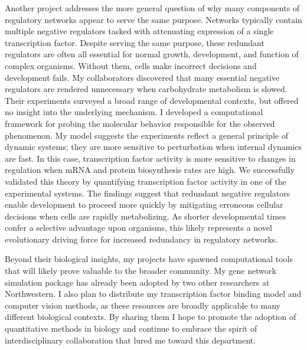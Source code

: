 Another project addresses the more general question of why many components of regulatory networks appear to serve the same purpose. Networks typically contain multiple negative regulators tasked with attenuating expression of a single transcription factor. Despite serving the same purpose, these redundant regulators are often all essential for normal growth, development, and function of complex organisms. Without them, cells make incorrect decisions and development fails. My collaborators discovered that many essential negative regulators are rendered unnecessary when carbohydrate metabolism is slowed. Their experiments surveyed a broad range of developmental contexts, but offered no insight into the underlying mechanism. I developed a computational framework for probing the molecular behavior responsible for the observed phenomenon. My model suggests the experiments reflect a general principle of dynamic systems; they are more sensitive to perturbation when internal dynamics are fast. In this case, transcription factor activity is more sensitive to changes in regulation when mRNA and protein biosynthesis rates are high. We successfully validated this theory by quantifying transcription factor activity in one of the experimental systems. The findings suggest that redundant negative regulators enable development to proceed more quickly by mitigating erroneous cellular decisions when cells are rapidly metabolizing. As shorter developmental times confer a selective advantage upon organisms, this likely represents a novel evolutionary driving force for increased redundancy in regulatory networks. 

Beyond their biological insights, my projects have spawned computational tools that will likely prove valuable to the broader community. My gene network simulation package has already been adopted by two other researchers at Northwestern. I also plan to distribute my transcription factor binding model and computer vision methods, as these resources are broadly applicable to many different biological contexts. By sharing them I hope to promote the adoption of quantitative methods in biology and continue to embrace the spirit of interdisciplinary collaboration that lured me toward this department.

